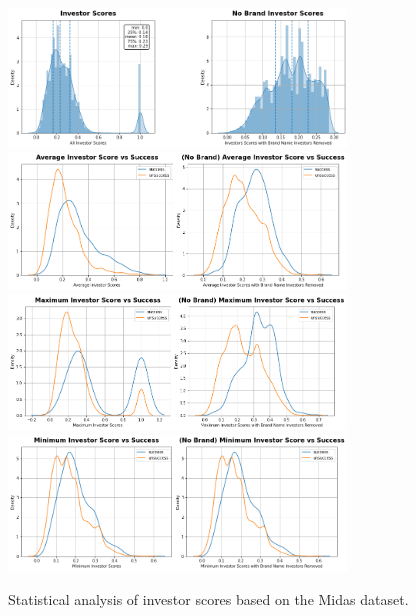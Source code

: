 \documentclass{article}
\begin{document}
\begin{figure}[h]
	\centering
	\includegraphics[width=0.8\textwidth]{figures/investor+nobrand_scores_distribution}
	\includegraphics[width=0.8\textwidth]{figures/investor+nobrand_average_vs_success}
	\includegraphics[width=0.8\textwidth]{figures/investor+nobrand_max_vs_success}
	\includegraphics[width=0.8\textwidth]{figures/investor+nobrand_min_vs_success}
	\caption{Statistical analysis of investor scores based on the Midas dataset.}
	\label{fig:investor_statistics}
\end{figure}
\end{document}
